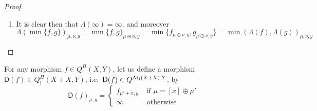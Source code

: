 \begin{proof}
\begin{enumerate}
	Moreover, suppose $f\in Q^{\Pi}_{!}(X, Y+Z)$ is additive, and let us show that $\pi_{1}( f)\in Q^{\Pi}_{!}(X,Y)$, defined by 
	$
	(\pi_{1}( f))_{\mu,y}= f_{\mu, \langle 0,y\rangle}
	$, is also additive: first observe that $\pi_{1}(f)=\pi_{1}\circ f$, where $\pi_{1}\in Q^{\Pi}_{!}(Y+Z,Y)$ is given by $(\pi_{1})_{\mu,y}=0$ if $\mu=[y]\oplus \emptyset$ and is $\infty$ otherwise; moreover, 
	$\pi_{1}(\min\{g,h\})=\min\{\pi_{1}(g),\pi_{1}(h)\}$, since 
	$(\pi_{1}(\min\{g,h\}))_{\mu, y}=(\min\{g,h\})_{\mu, \langle 0,y\rangle}= \min\{g_{\mu, \langle 0,y\rangle},h_{\mu, \langle 0,y\rangle}\}=( \min\{\pi_{1}(g),\pi_{1}(h)\})_{\mu, y}$. Now,
		given $h_{1},h_{2}\in Q^{\Pi}_{!}(X',X)$, we have that 
	$\pi_{1}(f)\circ \min\{h_{1},h_{2}\}= (\pi_{1}\circ f)\circ \min\{h_{1},h_{2}\}= \pi_{1}\circ (f\circ \min\{h_{1},h_{2}\})= \pi_{1}\circ \min\{f\circ h_{1},f\circ h_{2}\}= \pi_{1}(\min\{f\circ h_{1},f\circ h_{2}\})= \min\{\pi_{1}(f\circ h_{1}), \pi_{1}(f\circ h_{2})\}= \min\{\pi_{1}(f)\circ h_{1},\pi_{1}(f)\circ h_{2})$.
	
	\item  It is clear then that $\Lambda(\infty)=\infty$, and moreover
	$$
	\Lambda (\min\{f,g\})_{\mu,\nu,y}= \min\{ f,g\}_{\mu\oplus \nu,y}= \min\{f_{\mu\oplus\nu,y},g_{\mu\oplus\nu,y}\}= \min(\Lambda(f),\Lambda(g))_{\mu,\nu,y}
	$$
	
	\end{enumerate}


\end{proof}



For any morphism $f\in Q^{\Pi}_{!}(X,Y)$, let us define a morphism $\mathsf D(f)\in Q^{\Pi}_{!}(X+X,Y)$, i.e.~$\mathsf D(f)\in Q^{\mathcal{M}_{\mathsf f}(X+X),Y}$, by
$$
\mathsf D(f)_{\mu,y}=
\begin{cases}
f_{\mu'+x,y}
& \text{ if }\mu=[x]\oplus \mu'
\\
\infty & \text{ otherwise}
\end{cases}
$$




